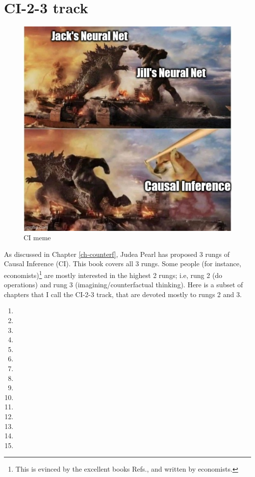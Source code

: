 \chapter*{CI-2-3 track}
\label{ci-track}

\begin{figure}[h!]
\centering
\includegraphics[width=5in]
{godzilla-kk-doge-nn-ci.jpg}
\caption{CI meme} 
\label{fig-godzilla-kk-doge}
\end{figure}

As discussed in Chapter \ref{ch-counterf},
Judea Pearl has proposed 3 rungs 
of Causal Inference (CI).
This book covers all 3 rungs.
Some people (for instance,
economists)\footnote{This is evinced by
the excellent books Refs.\cite{book-mixtape},
and \cite{alves-book}
written by economists.}
are mostly interested in the highest
2 rungs; i.e, 
rung 2 (do operations)
and rung 3 (imagining/counterfactual thinking).
Here is a subset of chapters
that I call
the CI-2-3 track,
that are devoted mostly to rungs 2 and 3. 


\begin{enumerate}
\item {}
\item {}
\item {}
\item {}
\item {}
\item {}
\item {}
\item {}
\item {}
\item {}
\item {}
\item {}
\item {}
\item {}
\item {}
\end{enumerate}